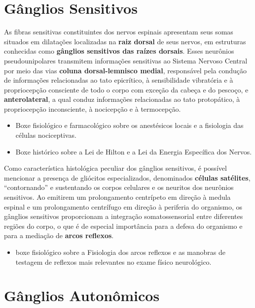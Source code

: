 \documentclass[
]{book}
\providecommand{\tightlist}{%
  \setlength{\itemsep}{0pt}\setlength{\parskip}{0pt}}
\theoremstyle{definition}
\theoremstyle{definition}
\theoremstyle{definition}
\theoremstyle{definition}
\theoremstyle{remark}
\begin{document}
\hypertarget{guxe2nglios-sensitivos}{%
\section{Gânglios Sensitivos}\label{guxe2nglios-sensitivos}}

As fibras sensitivas constituintes dos nervos espinais apresentam seus somas situados em dilatações localizadas na \textbf{raiz dorsal} de seus nervos, em estruturas conhecidas como \textbf{gânglios sensitivos das raízes dorsais}. Esses neurônios pseudounipolares transmitem informações sensitivas ao Sistema Nervoso Central por meio das vias \textbf{coluna dorsal-lemnisco medial}, responsável pela condução de informações relacionadas ao tato epicrítico, à sensibilidade vibratória e à propriocepção consciente de todo o corpo com exceção da cabeça e do pescoço, e \textbf{anterolateral}, a qual conduz informações relacionadas ao tato protopático, à propriocepção inconsciente, à nocicepção e à termocepção.

\begin{itemize}
\item
  Boxe fisiológico e farmacológico sobre os anestésicos locais e a fisiologia das células nociceptivas.
\item
  Boxe histórico sobre a Lei de Hilton e a Lei da Energia Específica dos Nervos.
\end{itemize}

Como característica histológica peculiar dos gânglios sensitivos, é possível mencionar a presença de gliócitos especializados, denominados \textbf{células satélites}, ``contornando'' e sustentando os corpos celulares e os neuritos dos neurônios sensitivos. Ao emitirem um prolongamento centrípeto em direção à medula espinal e um prolongamento centrífugo em direção à periferia do organismo, os gânglios sensitivos proporcionam a integração somatossensorial entre diferentes regiões do corpo, o que é de especial importância para a defesa do organismo e para a mediação de \textbf{arcos reflexos}.

\begin{itemize}
\tightlist
\item
  boxe fisiológico sobre a Fisiologia dos arcos reflexos e as manobras de testagem de reflexos mais relevantes no exame físico neurológico.
\end{itemize}

\hypertarget{guxe2nglios-autonuxf4micos}{%
\section{Gânglios Autonômicos}\label{guxe2nglios-autonuxf4micos}}
\end{document}
